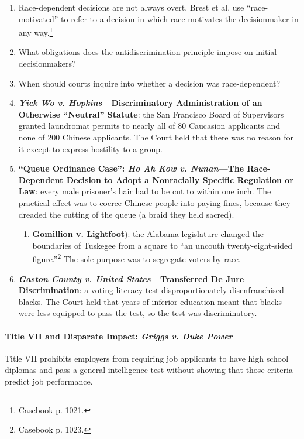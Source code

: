 \begin{enumerate}
    \item Race-dependent decisions are not always overt. Brest et al. use 
    ``race-motivated'' to refer to a decision in which race motivates the 
    decisionmaker in any way.\footnote{Casebook p. 1021.}
    \item What obligations does the antidiscrimination principle impose on 
    initial decisionmakers?
    \item When should courts inquire into whether a decision was 
    race-dependent?
    \item \textbf{\emph{Yick Wo v. Hopkins}---Discriminatory Administration of 
    an Otherwise ``Neutral'' Statute}: the San Francisco Board of Supervisors 
    granted laundromat permits to nearly all of 80 Caucasion applicants and 
    none of 200 Chinese applicants. The Court held that there was no reason 
    for it except to express hostility to a group.
    \item \textbf{``Queue Ordinance Case'': \emph{Ho Ah Kow v. Nunan}---The 
    Race-Dependent Decision to Adopt a Nonracially Specific Regulation or 
    Law}: every male prisoner's hair had to be cut to within one inch. The 
    practical effect was to coerce Chinese people into paying fines, because 
    they dreaded the cutting of the queue (a braid they held sacred).
    \begin{enumerate}
        \item \textbf{Gomillion v. Lightfoot}): the Alabama legislature 
        changed the boundaries of Tuskegee from a square to ``an uncouth 
        twenty-eight-sided figure.''\footnote{Casebook p. 1023.} The sole 
        purpose was to segregate voters by race.
    \end{enumerate}
    \item \textbf{\emph{Gaston County v. United States}---Transferred De Jure 
    Discrimination}: a voting literacy test disproportionately disenfranchised 
    blacks. The Court held that years of inferior education meant that blacks 
    were less equipped to pass the test, so the test was discriminatory.
\end{enumerate}
 
\paragraph{Title VII and Disparate Impact: \emph{Griggs v. Duke Power}}

Title VII prohibits employers from requiring job applicants to have high 
school diplomas and pass a general intelligence test without showing that 
those criteria predict job performance.

